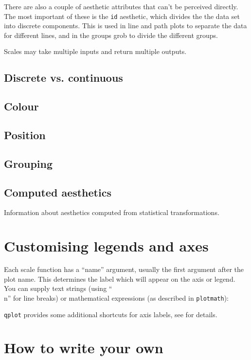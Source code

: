 There are also a couple of aesthetic attributes that can't be perceived directly.  The most important of these is the {\tt id} aesthetic, which divides the the data set into discrete components.   This is used in line and path plots to separate the data for different lines, and in the groups grob to divide the different groups. 

Scales may take multiple inputs and return multiple outputs.

\subsection{Discrete vs. continuous}\label{sec:discrete_vs_continuous}
\subsection{Colour}\label{sub:colour}
\subsection{Position}\label{sub:position}
\subsection{Grouping}\label{sub:grouping}


\subsection{Computed aesthetics}\label{sub:computed_aesthetics} 

Information about aesthetics computed from statistical transformations.

\section{Customising legends and axes}\label{sec:customising_legends_and_axes}

Each scale function has a ``name'' argument, usually the first argument after the plot name.  This determines the label which will appear on the axis or legend. You can supply text strings (using ``\\n'' for line breaks) or mathematical expressions (as described in \verb|plotmath|):


\verb|qplot| provides some additional shortcuts for axis labels, see  for details.


\section{How to write your own}\label{sec:how_to_write_your_own_scales}



